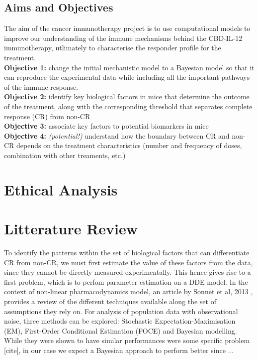 \documentclass[11pt]{article}
\begin{document}
\subsection{Aims and Objectives}
\noindent The aim of the cancer immunotherapy project is to use computational models to improve our understanding of the immune mechanisms behind the CBD-IL-12 immunotherapy, utlimately to characterise the responder profile for the treatment.\\[8pt]
\textbf{Objective 1:} change the initial mechanistic model to a Bayesian model so that it can reproduce the experimental data while including all the important pathways of the immune response.\\ 
\textbf{Objective 2:} identify key biological factors in mice that determine the outcome of the treatment, along with the corresponding threshold that separates complete response (CR) from non-CR \\ 
\textbf{Objective 3:} associate key factors to potential biomarkers in mice\\ 
\textbf{Objective 4:} \textit{(potential!)}  understand how the boundary between CR and non-CR depends on the treatment characteristics (number and frequency of doses, combination with other treaments, etc.)

\section{Ethical Analysis}
\lipsum[1-1]

\pagebreak

\section{Litterature Review}\label{sec:littrev}

To identify the patterns within the set of biological factors that can differentiate CR from non-CR, we must first estimate the value of these factors from the data, since they cannot be directly measured experimentally. This hence gives rise to a first problem, which is to perfom parameter estimation on a DDE model. In the context of non-linear pharmacodynamics model, an article by Sonnet et al, 2013 \cite{revParamEst}, provides a review of the different techniques available along the set of assumptions they rely on. For analysis of population data with observational noise, three methods can be explored: Stochastic Expectation-Maximisation (EM), First-Order Conditional Estimation (FOCE) and Bayesian modelling. While they were shown to have similar performances were some specific problem [cite], in our case we expect a Bayesian approach to perform better since ... 
\end{document}
